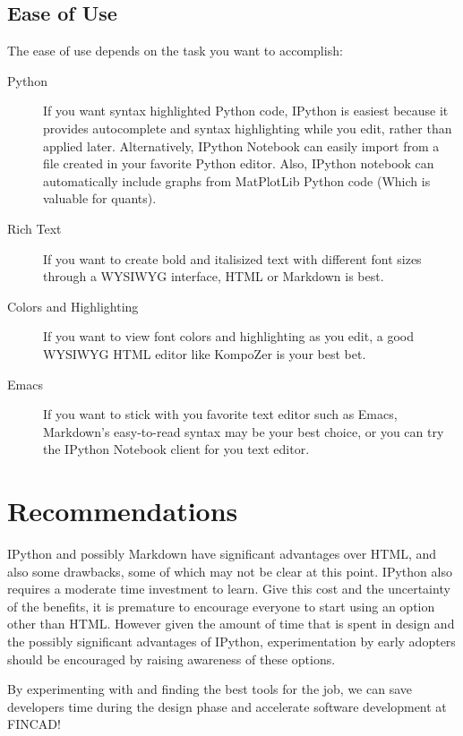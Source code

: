 \documentclass[12pt]{Report}
\begin{document}
\subsection{Ease of Use}
The ease of use depends on the task you want to accomplish:
\begin{description}
	\item[Python] 
		If you want syntax highlighted Python code, IPython is easiest because it provides autocomplete and syntax highlighting while 
		you edit, rather than applied later.  Alternatively, IPython Notebook can easily import from a file created in your favorite Python editor.  Also, IPython notebook can automatically include graphs from MatPlotLib Python code (Which is valuable for quants).
	\item[Rich Text] 
		If you want to create bold and italisized text with different font sizes through a WYSIWYG interface, HTML or Markdown is best.
	\item[Colors and Highlighting] 
		If you want to view font colors and highlighting as you edit, a good WYSIWYG HTML editor like KompoZer is your best bet.
	\item[Emacs]
		If you want to stick with you favorite text editor such as Emacs, Markdown's easy-to-read syntax may be your best choice, or you can try the IPython Notebook client for you text editor.
\end{description}
	




\section{Recommendations}
	IPython and possibly Markdown have significant advantages over HTML, and also some drawbacks, some of which may not be clear at this point.  
	IPython also requires a moderate time investment to learn.  Give this cost and the uncertainty of the benefits, it is premature to encourage 
	everyone to start using an option other than HTML.  However given the amount of time that is spent in design and the possibly significant 
	advantages of IPython, experimentation by early adopters should be encouraged by raising awareness of these options.
	
	By experimenting with and finding the best tools for the job, 
	we can save developers time during the design phase and accelerate software development at FINCAD!
	
\end{document}
